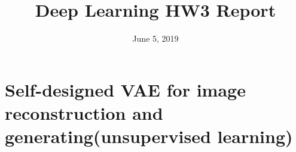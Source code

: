 \documentclass[11pt, a4paper]{article} %
\title{Deep Learning HW3 Report} %
\begin{document}


\date{June 5, 2019}

\maketitle{} %

\setcounter{page}{1} %

\section{Self-designed VAE for image reconstruction and generating(unsupervised learning)} %
\end{document}
